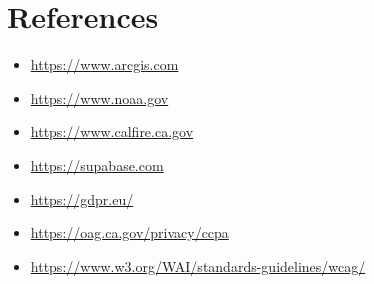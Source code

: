 \documentclass[12pt]{article}
\begin{document}
\newpage
\section*{References}
\begin{itemize}
\item \url{https://www.arcgis.com}
\item \url{https://www.noaa.gov}
\item \url{https://www.calfire.ca.gov}
\item \url{https://supabase.com}
\item \url{https://gdpr.eu/}
\item \url{https://oag.ca.gov/privacy/ccpa}
\item \url{https://www.w3.org/WAI/standards-guidelines/wcag/}
\end{itemize}
\end{document}
